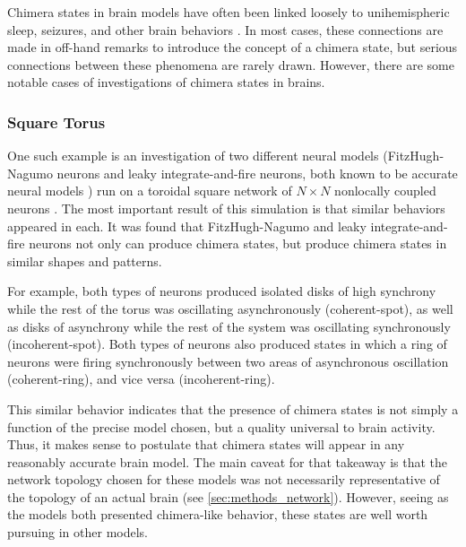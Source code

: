 Chimera states in brain models have often been linked loosely to
unihemispheric sleep,
seizures,
and other brain behaviors \cite{Abrams2008,Panaggio2015,Martens2013,Abrams2004,Shanahan2010,Hohlein2019,Bansal2019,Chouzouris2018}.
In most cases,
these connections are made in off-hand remarks to introduce the concept of a chimera state,
but serious connections between these phenomena are rarely drawn.
However,
there are some notable cases of investigations of chimera states in brains.

\subsubsection{Square Torus}
\label{sec:lit_review_chimera_square_torus}
One such example is an investigation of two different neural models
(FitzHugh-Nagumo neurons and leaky integrate-and-fire neurons, both known to be accurate neural models \cite{Deco2008})
run on a toroidal square network of $N \times N$ nonlocally coupled neurons \cite{Schmidt2017}.
The most important result of this simulation is that similar behaviors appeared in each.
It was found that FitzHugh-Nagumo and leaky integrate-and-fire neurons not only can produce chimera states,
but produce chimera states in similar shapes and patterns.

For example,
both types of neurons produced isolated disks of high synchrony while the rest of the torus was oscillating asynchronously (coherent-spot),
as well as disks of asynchrony while the rest of the system was oscillating synchronously (incoherent-spot).
Both types of neurons also produced states in which a ring of neurons were firing synchronously
between two areas of asynchronous oscillation (coherent-ring),
and vice versa (incoherent-ring).

This similar behavior indicates that the presence of chimera states is not simply a function of the precise model chosen,
but a quality universal to brain activity.
Thus, it makes sense to postulate that chimera states will appear in any reasonably accurate brain model.
The main caveat for that takeaway is that the network topology chosen for these models was not necessarily representative of the topology of an actual brain (see \cref{sec:methods_network}).
However, seeing as the models both presented chimera-like behavior,
these states are well worth pursuing in other models.

